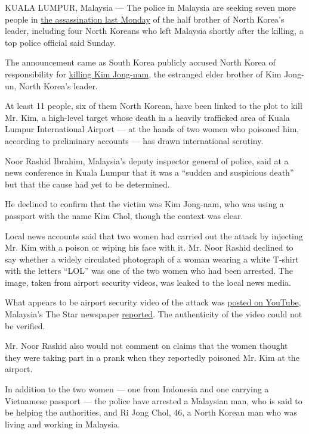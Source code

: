 KUALA LUMPUR, Malaysia --- The police in Malaysia are seeking seven more
people in
\href{https://www.nytimes.com/2017/02/14/world/asia/kim-jong-un-brother-killed-malaysia.html}{the
assassination last Monday} of the half brother of North Korea's leader,
including four North Koreans who left Malaysia shortly after the
killing, a top police official said Sunday.

The announcement came as South Korea publicly accused North Korea of
responsibility for
\href{https://www.nytimes.com/2017/02/15/world/asia/kim-jong-nam-assassination-north-korea.html}{killing
Kim Jong-nam}, the estranged elder brother of Kim Jong-un, North Korea's
leader.

At least 11 people, six of them North Korean, have been linked to the
plot to kill Mr. Kim, a high-level target whose death in a heavily
trafficked area of Kuala Lumpur International Airport --- at the hands
of two women who poisoned him, according to preliminary accounts --- has
drawn international scrutiny.

Noor Rashid Ibrahim, Malaysia's deputy inspector general of police, said
at a news conference in Kuala Lumpur that it was a ``sudden and
suspicious death'' but that the cause had yet to be determined.

He declined to confirm that the victim was Kim Jong-nam, who was using a
passport with the name Kim Chol, though the context was clear.

Local news accounts said that two women had carried out the attack by
injecting Mr. Kim with a poison or wiping his face with it. Mr. Noor
Rashid declined to say whether a widely circulated photograph of a woman
wearing a white T-shirt with the letters ``LOL'' was one of the two
women who had been arrested. The image, taken from airport security
videos, was leaked to the local news media.

What appears to be airport security video of the attack was
\href{https://www.youtube.com/watch?v=Zjfm_XOxLOs\&t=196s}{posted on
YouTube}, Malaysia's The Star newspaper
\href{http://www.thestar.com.my/news/nation/2017/02/19/video-clip-allegedly-of-jong-nam-murder-appears-on-youtube/}{reported}.
The authenticity of the video could not be verified.

Mr. Noor Rashid also would not comment on claims that the women thought
they were taking part in a prank when they reportedly poisoned Mr. Kim
at the airport.

In addition to the two women --- one from Indonesia and one carrying a
Vietnamese passport --- the police have arrested a Malaysian man, who is
said to be helping the authorities, and Ri Jong Chol, 46, a North Korean
man who was living and working in Malaysia.

